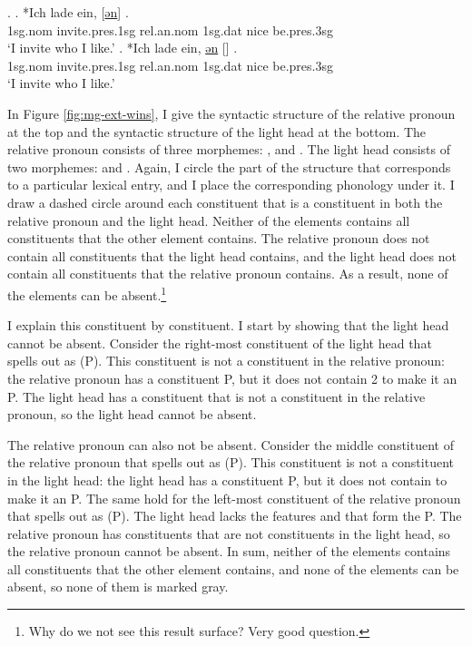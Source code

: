 \ex.\label{ex:mg-acc-nom-rep}
\ag. *Ich {lade ein}, [\underline{ən}] \underline{}   .\\
1\ac{sg}.\ac{nom} invite.\ac{pres}.1\ac{sg}\scsub{[acc]} \ac{rel}.\ac{an}.\ac{nom} 1\ac{sg}.\ac{dat} nice be.\ac{pres}.3\ac{sg}\scsub{[nom]}\\
`I invite who I like.' \label{ex:mg-acc-nom-rep-rel}
\bg. *Ich {lade ein}, \underline{ən} [\underline{}]   .\\
1\ac{sg}.\ac{nom} invite.\ac{pres}.1\ac{sg}\scsub{[acc]} \ac{rel}.\ac{an}.\ac{nom} 1\ac{sg}.\ac{dat} nice be.\ac{pres}.3\ac{sg}\scsub{[nom]}\\
`I invite who I like.' \label{ex:mg-acc-nom-rep-lh}

In Figure \ref{fig:mg-ext-wins}, I give the syntactic structure of the relative pronoun at the top and the syntactic structure of the light head at the bottom.
The relative pronoun consists of three morphemes: ,  and .
The light head consists of two morphemes:  and .
Again, I circle the part of the structure that corresponds to a particular lexical entry, and I place the corresponding phonology under it.
I draw a dashed circle around each constituent that is a constituent in both the relative pronoun and the light head.
Neither of the elements contains all constituents that the other element contains. The relative pronoun does not contain all constituents that the light head contains, and the light head does not contain all constituents that the relative pronoun contains. As a result, none of the elements can be absent.\footnote{
Why do we not see this result surface? Very good question.
}

I explain this constituent by constituent.
I start by showing that the light head cannot be absent.
Consider the right-most constituent of the light head that spells out as  (P). This constituent is not a constituent in the relative pronoun: the relative pronoun has a constituent P, but it does not contain 2 to make it an P.
The light head has a constituent that is not a constituent in the relative pronoun, so the light head cannot be absent.

The relative pronoun can also not be absent.
Consider the middle constituent of the relative pronoun that spells out as  (P). This constituent is not a constituent in the light head: the light head has a constituent P, but it does not contain  to make it an P.
The same hold for the left-most constituent of the relative pronoun that spells out as  (P). The light head lacks the features  and  that form the P.
The relative pronoun has constituents that are not constituents in the light head, so the relative pronoun cannot be absent.
In sum, neither of the elements contains all constituents that the other element contains, and none of the elements can be absent, so none of them is marked gray.

